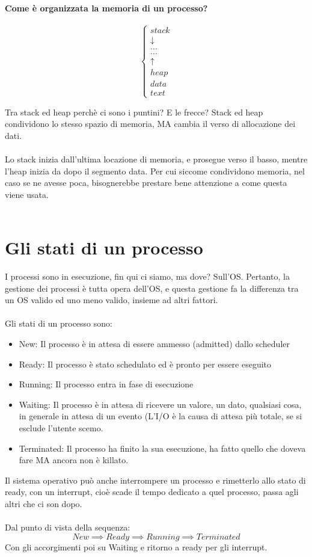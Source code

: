 \documentclass[12pt, a4paper, openany, twoside]{book}
\begin{document}
\paragraph{Come è organizzata la memoria di un processo?}
\[
\begin{cases}
stack \\
\downarrow \\
... \\
... \\
\uparrow \\
heap \\
data \\
text
\end{cases}
\]

Tra stack ed heap perchè ci sono i puntini? E le frecce? Stack ed heap 
condividono lo stesso spazio di memoria, MA cambia il verso di allocazione
dei dati. \\ \\
Lo stack inizia dall'ultima locazione di memoria, e prosegue verso il basso,
mentre l'heap inizia da dopo il segmento data. Per cui siccome condividono
memoria, nel caso se ne avesse poca, bisognerebbe prestare bene attenzione
a come questa viene usata. \\ \\
\section{Gli stati di un processo}
I processi sono in esecuzione, fin qui ci siamo, ma dove? Sull'OS. Pertanto,
la gestione dei processi è tutta opera dell'OS, e questa gestione fa la 
differenza tra un OS valido ed uno meno valido, insieme ad altri fattori.\\ 
\\
Gli stati di un processo sono:
\begin{itemize}
	\item New: Il processo è in attesa di essere ammesso (admitted) dallo
	scheduler
	\item Ready: Il processo è stato schedulato ed è pronto per essere 
	eseguito 
	\item Running: Il processo entra in fase di esecuzione
	\item Waiting: Il processo è in attesa di ricevere un valore, un dato, 
	qualsiasi cosa, in generale in attesa di un evento (L'I/O è la causa
	di attesa più totale, se si esclude l'utente scemo.
	\item Terminated: Il processo ha finito la sua esecuzione, ha fatto 
	quello che doveva fare MA ancora non è killato.
\end{itemize}
Il sistema operativo può anche interrompere un processo e rimetterlo allo stato
di ready, con un interrupt, cioè scade il tempo dedicato a quel processo, passa
agli altri che ci son dopo.
\\ \\
Dal punto di vista della sequenza: \\
$$New \implies Ready \implies Running \implies Terminated$$
Con gli accorgimenti poi su Waiting e ritorno a ready per gli interrupt. 
\end{document}
